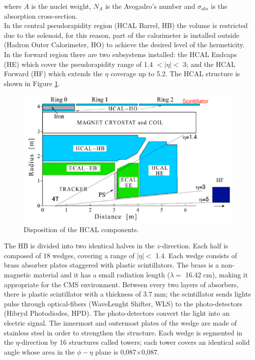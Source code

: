 \noindent where $A$ is the nuclei weight, $N_{A}$ is the Avogadro's number and $\sigma_{abs}$
is the absorption cross-section.\\

\noindent In the central pseudorapidity region (HCAL Barrel, HB) the volume
is restricted due to the solenoid, for this reason, part of the calorimeter is installed 
outside (Hadron Outer Calorimeter, HO) to achieve the desired level of the hermeticity. In 
the forward region there are two subsystems installed: the HCAL Endcaps (HE) 
which cover the pseudorapidity range of 1.4 $< |\eta| <$ 3; and the HCAL Forward (HF) which 
extends the $\eta$ coverage up to 5.2. The HCAL structure is shown in Figure \ref{figchp2:HCAL}.



\begin{center}
\begin{figure}[h]
\centering
\includegraphics[scale=0.4]{figuras/Chapter2/HCAL1}
\caption{Disposition of the HCAL components.}\label{figchp2:HCAL}
\end{figure}
\end{center}

\noindent The HB is divided into two identical halves in the $z$-direction. Each half is composed of 18
wedges, covering a range of $|\eta| < $ 1.4. Each wedge consists of brass absorber plates 
staggered with plastic scintillators. The brass is a non-magnetic material and it has a 
small radiation length ($\lambda = $ 16.42 cm), making it appropriate for the CMS environment. Between every
two layers of absorbers, there is plastic scintillator with a thickness of 3.7 mm; the scintillator 
sends lights pulse through optical-fibers (WaveLenght Shifter, WLS) to the
photo-detectors (Hibryd Photodiodes, HPD). The photo-detectors convert the light 
into an electric signal. The innermost and outermost plates of 
the wedge are made of stainless steel in order to strengthen the structure. Each wedge 
is segmented in the $\eta$-direction by 16 structures called towers; each tower 
covers an identical solid angle whose area in the $\phi-\eta$ plane is 0,087$\times$0,087. \\

